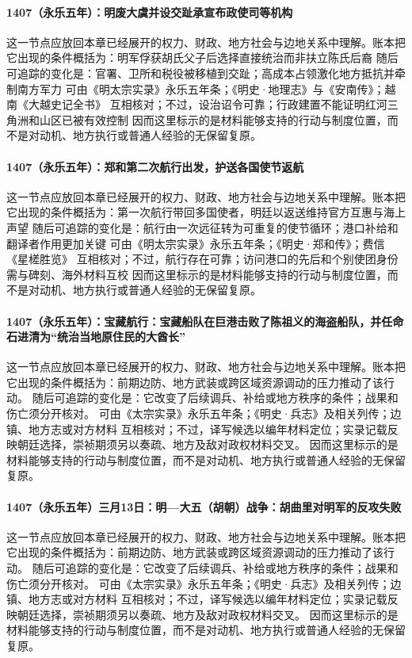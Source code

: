 \paragraph{1407（永乐五年）：明废大虞并设交趾承宣布政使司等机构} 这一节点应放回本章已经展开的权力、财政、地方社会与边地关系中理解。账本把它出现的条件概括为：明军俘获胡氏父子后选择直接统治而非扶立陈氏后裔 随后可追踪的变化是：官署、卫所和税役被移植到交趾；高成本占领激化地方抵抗并牵制南方军力 可由《明太宗实录》永乐五年条；《明史·地理志》与《安南传》；越南《大越史记全书》 互相核对；不过，设治诏令可靠；行政建置不能证明红河三角洲和山区已被有效控制 因而这里标示的是材料能够支持的行动与制度位置，而不是对动机、地方执行或普通人经验的无保留复原。

\paragraph{1407（永乐五年）：郑和第二次航行出发，护送各国使节返航} 这一节点应放回本章已经展开的权力、财政、地方社会与边地关系中理解。账本把它出现的条件概括为：第一次航行带回多国使者，明廷以返送维持官方互惠与海上声望 随后可追踪的变化是：航行由一次远征转为可重复的使节循环；港口补给和翻译者作用更加关键 可由《明太宗实录》永乐五年条；《明史·郑和传》；费信《星槎胜览》 互相核对；不过，航行存在可靠；访问港口的先后和个别使团身份需与碑刻、海外材料互校 因而这里标示的是材料能够支持的行动与制度位置，而不是对动机、地方执行或普通人经验的无保留复原。

\paragraph{1407（永乐五年）：宝藏航行：宝藏船队在巨港击败了陈祖义的海盗船队，并任命石进清为“统治当地原住民的大酋长”} 这一节点应放回本章已经展开的权力、财政、地方社会与边地关系中理解。账本把它出现的条件概括为：前期边防、地方武装或跨区域资源调动的压力推动了该行动。 随后可追踪的变化是：它改变了后续调兵、补给或地方秩序的条件；战果和伤亡须分开核对。 可由《太宗实录》永乐五年条；《明史·兵志》及相关列传；边镇、地方志或对方材料 互相核对；不过，译写候选以编年材料定位；实录记载反映朝廷选择，崇祯期须另以奏疏、地方及敌对政权材料交叉。 因而这里标示的是材料能够支持的行动与制度位置，而不是对动机、地方执行或普通人经验的无保留复原。

\paragraph{1407（永乐五年）三月13日：明—大五（胡朝）战争：胡曲里对明军的反攻失败} 这一节点应放回本章已经展开的权力、财政、地方社会与边地关系中理解。账本把它出现的条件概括为：前期边防、地方武装或跨区域资源调动的压力推动了该行动。 随后可追踪的变化是：它改变了后续调兵、补给或地方秩序的条件；战果和伤亡须分开核对。 可由《太宗实录》永乐五年条；《明史·兵志》及相关列传；边镇、地方志或对方材料 互相核对；不过，译写候选以编年材料定位；实录记载反映朝廷选择，崇祯期须另以奏疏、地方及敌对政权材料交叉。 因而这里标示的是材料能够支持的行动与制度位置，而不是对动机、地方执行或普通人经验的无保留复原。

